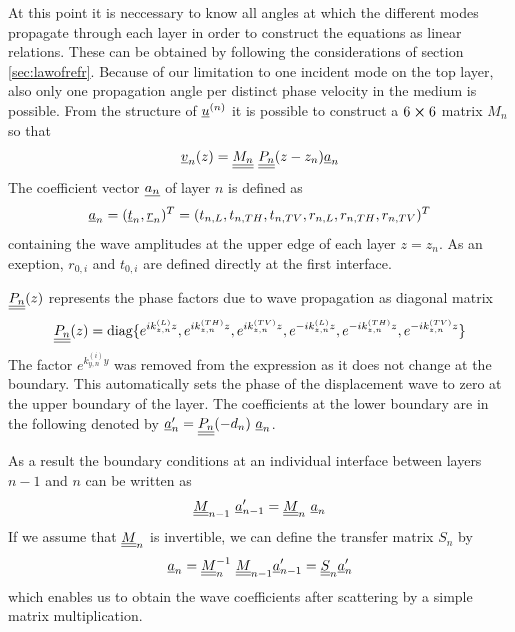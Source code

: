 At this point it is neccessary to know all angles at which the different modes
propagate through each layer in order to construct the equations as linear
relations. These can be obtained by following the considerations of section
\ref{sec:lawofrefr}.  Because of our limitation to one incident mode on the top
layer, also only one propagation angle per distinct phase velocity in the
medium is possible. From the structure of
$\underline{u}^{(n)}$ it is possible to construct a $6\cross6$ matrix $M_n$ so that
\begin{equation}
    \uline{v}_n(z) = \uuline{M_n}\ \uuline{P_n}(z-z_n)\uline{a}_n
\end{equation}
The coefficient vector $\underline{a_n}$ of layer $n$ is defined as
\begin{equation}
    \underline{a}_n = (\underline{t}_n, \underline{r}_n)^T	= (t_{n,L}, t_{n,TH}, t_{n,TV},
    r_{n,L}, r_{n,TH}, r_{n,TV})^T
\end{equation}
containing the wave amplitudes at the upper edge of each layer $z = z_n$. As an
exeption, $r_{0,i}$ and $t_{0,i}$ are defined directly at the first interface.

$\underline{\underline{P_n}}(z)$ represents the phase factors due to wave propagation
as diagonal matrix
\begin{equation} \label{eq:PmatTMM}
    \underline{\underline{P_n}}(z) = \text{diag}\{ e^{ik_{z,n}^{(L)}z},
    e^{ik_{z,n}^{(TH)}z},
    e^{ik_{z,n}^{(TV)}z}, e^{-ik_{z,n}^{(L)}z}, e^{-ik_{z,n}^{(TH)}z},
    e^{-ik_{z,n}^{(TV)}z}\}
\end{equation}
The factor $e^{k_{y,n}^{(i)} y}$ was removed from the expression as it does not
change at the boundary. This automatically sets the phase of the displacement
wave to zero at the upper boundary of the layer. The coefficients at the lower
boundary are in the following denoted by $\underline{a}_n^\prime =
    \underline{\underline{P_n}}(-d_n)\ \underline{a}_n$.

As a result the boundary conditions at an individual interface between layers
$n-1$ and $n$ can be written as
\begin{equation}
    \uuline{M}_{n-1}\ \uline{a}_{n-1}^\prime = \uuline{M}_{n}\ \uline{a}_{n}
\end{equation}
If we assume that $\underline{\underline{M}}_{n}$ is invertible, we can define the
transfer matrix $S_n$ by
\begin{equation}
    \uline{a}_{n} = \uuline{M}_{n}^{-1}\ \uuline{M}_{n-1}
    \uline{a}_{n-1}^\prime
    = \uuline{S}_n \uline{a}_n^\prime
\end{equation}
which enables us to obtain the wave coefficients after scattering by a simple
matrix multiplication.

